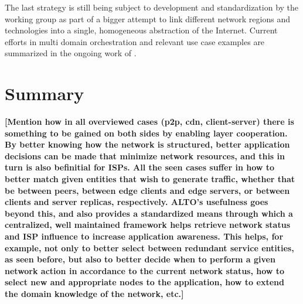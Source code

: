     The last strategy is still being subject to development and standardization by the working group as part of a bigger attempt to link different network regions and technologies into a single, homogeneous abstraction of the Internet.
    Current efforts in multi domain orchestration and relevant use case examples are summarized in the ongoing work of \cite{alto-multi-domain-use-cases}.

\section{Summary}


\textbf{[Mention how in all overviewed cases (p2p, cdn, client-server) there is something to be gained on both sides by enabling layer cooperation. By better knowing how the network is structured, better application decisions can be made that minimize network resources, and this in turn is also befinitial for ISPs. All the seen cases suffer in how to better match given entities that wish to generate traffic, whether that be between peers, between edge clients and edge servers, or between clients and server replicas, respectively. ALTO's usefulness goes beyond this, and also provides a standardized means through which a centralized, well maintained  framework helps retrieve network status and ISP influence to increase application awareness. This helps, for example, not only to better select between redundant service entities, as seen before, but also to better decide when to perform a given network action in accordance to the current network status, how to select new and appropriate nodes to the application, how to extend the domain knowledge of the network, etc.]}
